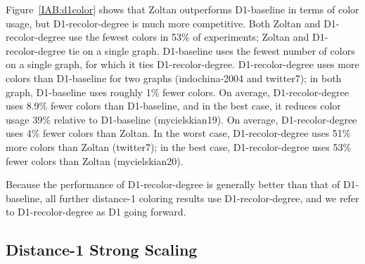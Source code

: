 Figure~\ref{IAB:d1color} shows that Zoltan outperforms D1-baseline in terms of color usage, but D1-recolor-degree is much more competitive.
Both Zoltan and D1-recolor-degree use the fewest colors in 53\% of experiments; Zoltan and D1-recolor-degree tie on a single graph.
D1-baseline uses the fewest number of colors on a single graph, for which it ties D1-recolor-degree.
D1-recolor-degree uses more colors than D1-baseline for two graphs (indochina-2004 and twitter7); in both graph, D1-baseline uses roughly 1\% fewer colors.
On average, D1-recolor-degree  uses 8.9\% fewer colors than D1-baseline, 
and in the best case, it reduces color usage  39\% relative to D1-baseline (mycielskian19).
On average, D1-recolor-degree uses 4\% fewer colors than Zoltan.
In the worst case, D1-recolor-degree uses 51\% more colors than Zoltan (twitter7); in the best case,
D1-recolor-degree uses 53\% fewer colors than Zoltan (mycielskian20).

Because the performance of D1-recolor-degree is generally better than that of D1-baseline, 
all further distance-1 coloring results use D1-recolor-degree, and we refer to D1-recolor-degree as D1 going forward.

\subsection{Distance-1 Strong Scaling}



